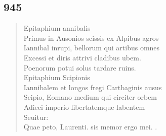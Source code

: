 \documentclass[11pt, a4paper]{report}
\begin{document}
            \subsection*{945}
      \begin{verse}
      Epitaphium annibalis \\ Primus in Ausonios scissis ex Alpibus agros \\ Iannibal inrupi, bellorum qui artibus omnes \\ Excessi et diris attrivi cladibus ubem. \\ Poenorum potui solus tardare ruins. \\ Epitaphium Scipionis \\ Iannibalem et longos fregi Cartbaginis ausus \\ Scipio, Eomano medium qui circiter orbem \\ Adieci imperio libertatemque labentem \\ Seuitur: \\ Quae peto, Laurenti. sis memor ergo mei. . \\ 
      \end{verse}
  
\end{document}
